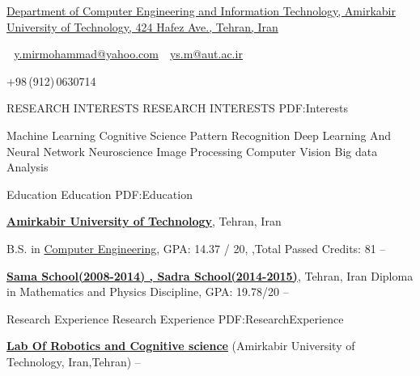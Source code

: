 \documentclass[letterpaper,MMMyyyy,nonstopmode]{simpleresumecv}
\newcommand{\CVAuthor}{ Yasaman Mirmohammad}
\newcommand{\CVWebpage}{}
\begin{document}

\Title{\CVAuthor}

\begin{SubTitle}
\href{https://www.google.com/maps/place/Amirkabir+University+of+Technology+(Polytechnic}
{Department of Computer Engineering and Information Technology, Amirkabir University of Technology, 424 Hafez Ave., Tehran, Iran}
\par
\,\SubBulletSymbol\,
\href{y.mirmohammad@yahoo.com}
{y.mirmohammad@yahoo.com}
\,\SubBulletSymbol\,
\href{ys.m@aut.ac.ir}
{ys.m@aut.ac.ir}
\,\SubBulletSymbol\,

+98\,(912)\,0630714
\,\SubBulletSymbol\,
\href{\CVWebpage}
{\url{\CVWebpage}}
\end{SubTitle}

\begin{Body}

\Section
{RESEARCH INTERESTS}
{RESEARCH INTERESTS}
{PDF:Interests}

\Entry

\BulletItem
Machine Learning
\BulletItem
Cognitive Science
\BulletItem
Pattern Recognition
\BulletItem
Deep Learning And Neural Network
\BulletItem
Neuroscience
\BulletItem
Image Processing
\BulletItem
Computer Vision
\BulletItem
Big data Analysis



\Section
{Education}
{Education}
{PDF:Education}

\Entry
\href{http://www.aut.ac.ir}
{\textbf{Amirkabir University of Technology}},
Tehran, Iran

\Gap
\BulletItem
B.S. in
\href{http://ceit.aut.ac.ir}
{Computer Engineering}, 
  GPA: 14.37 / 20,
  ,Total Passed Credits: 81
\hfill
{} --  

\href{}
{\textbf{Sama School(2008-2014) , Sadra School(2014-2015)}},
Tehran, Iran
\BulletItem
Diploma in Mathematics and Physics Discipline, 
GPA: 19.78/20
\hfill
{}--

\begin{Detail}

\end{Detail}


\BullENCE %

\Section
{Research Experience}
{Research Experience}
{PDF:ResearchExperience}

\Entry
\href{}
{\textbf{Lab Of Robotics and Cognitive science}} 
\newline (Amirkabir University of Technology,
Iran,Tehran)
\hfill
{} --



\end{Body}
\end{document}
